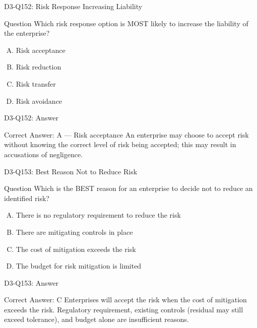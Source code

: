 \documentclass{beamer}
\begin{document}
	\begin{frame}{D3-Q152: Risk Response Increasing Liability}
		\begin{block}{Question}
			Which risk response option is MOST likely to increase the liability of the enterprise?
		\end{block}
		\begin{enumerate}[(A)]
			\item Risk acceptance
			\item Risk reduction
			\item Risk transfer
			\item Risk avoidance
		\end{enumerate}
	\end{frame}
	\begin{frame}{D3-Q152: Answer}
		\begin{block}{Correct Answer: A --- Risk acceptance}
			An enterprise may choose to accept risk without knowing the correct level of risk being accepted; this may result in accusations of negligence.
		\end{block}
	\end{frame}
	
	\begin{frame}{D3-Q153: Best Reason Not to Reduce Risk}
		\begin{block}{Question}
			Which is the BEST reason for an enterprise to decide not to reduce an identified risk?
		\end{block}
		\begin{enumerate}[(A)]
			\item There is no regulatory requirement to reduce the risk
			\item There are mitigating controls in place
			\item The cost of mitigation exceeds the risk
			\item The budget for risk mitigation is limited
		\end{enumerate}
	\end{frame}
	\begin{frame}{D3-Q153: Answer}
		\begin{block}{Correct Answer: C}
			Enterprises will accept the risk when the cost of mitigation exceeds the risk. Regulatory requirement, existing controls (residual may still exceed tolerance), and budget alone are insufficient reasons.
		\end{block}
	\end{frame}
	
\end{document}
